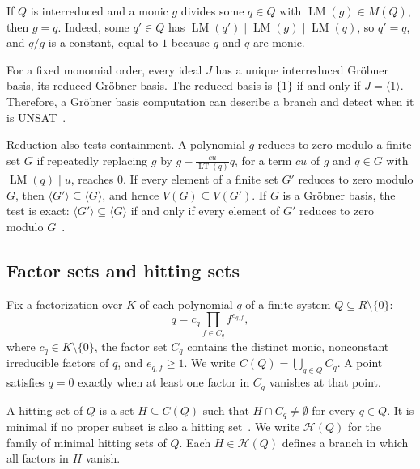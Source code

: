 If $Q$ is interreduced and a monic $g$ divides some $q\in Q$ with
$\operatorname{LM}(g)\in M(Q)$, then $g=q$. Indeed, some $q'\in Q$ has
$\operatorname{LM}(q')\mid\operatorname{LM}(g)\mid\operatorname{LM}(q)$, so
$q'=q$, and $q/g$ is a constant, equal to $1$ because $g$ and $q$ are monic.

For a fixed monomial order, every ideal $J$ has a unique interreduced
Gr\"obner basis, its reduced Gr\"obner basis.
The reduced basis is $\{1\}$ if and only if $J=\langle1\rangle$. Therefore, a
Gr\"obner basis computation can describe a branch and detect when it is
UNSAT~\cite{cox2015ideals,kreuzer2000computational}.

Reduction also tests containment. A polynomial $g$ reduces to zero modulo a
finite set $G$ if repeatedly replacing $g$ by
$g-\frac{cu}{\operatorname{LT}(q)}q$, for a term $cu$ of $g$ and $q\in G$
with $\operatorname{LM}(q)\mid u$, reaches $0$. If every element of a finite
set $G'$ reduces to zero modulo $G$, then
$\langle G'\rangle\subseteq\langle G\rangle$, and hence
$V(G)\subseteq V(G')$. If $G$ is a Gr\"obner basis, the test is exact:
$\langle G'\rangle\subseteq\langle G\rangle$ if and only if every element of
$G'$ reduces to zero modulo $G$~\cite[Ch.~2, \S\S3, 6]{cox2015ideals}.

\subsection{Factor sets and hitting sets}

Fix a factorization over $K$ of each polynomial $q$ of a finite system
$Q\subseteq R\setminus\{0\}$:
\[
  q=c_q\prod_{f\in C_q}f^{e_{q,f}},
\]
where $c_q\in K\setminus\{0\}$, the factor set $C_q$ contains the distinct
monic, nonconstant irreducible factors of $q$, and $e_{q,f}\geq1$. We write
$C(Q)=\bigcup_{q\in Q}C_q$.
A point satisfies $q=0$ exactly
when at least one factor in $C_q$ vanishes at that point.

A hitting set of $Q$ is a set $H\subseteq C(Q)$ such that $H\cap
C_q\neq\emptyset$ for every $q\in Q$.
It is minimal if no proper subset is also a hitting
set~\cite{berge1989hypergraphs}.
We write $\mathcal H(Q)$ for the family of minimal hitting sets of $Q$.
Each $H\in\mathcal H(Q)$ defines a branch in which all factors in $H$
vanish.

